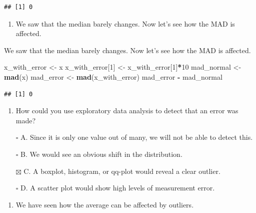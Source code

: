 \documentclass[
]{article}
\newenvironment{Shaded}{\begin{snugshade}}{\end{snugshade}}
\newcommand{\DecValTok}[1]{\textcolor[rgb]{0.00,0.00,0.81}{#1}}
\newcommand{\KeywordTok}[1]{\textcolor[rgb]{0.13,0.29,0.53}{\textbf{#1}}}
\newcommand{\NormalTok}[1]{#1}
\newcommand{\OperatorTok}[1]{\textcolor[rgb]{0.81,0.36,0.00}{\textbf{#1}}}
\newcommand{\StringTok}[1]{\textcolor[rgb]{0.31,0.60,0.02}{#1}}
\providecommand{\tightlist}{%
  \setlength{\itemsep}{0pt}\setlength{\parskip}{0pt}}
\begin{document}
\begin{verbatim}
## [1] 0
\end{verbatim}

\begin{enumerate}
\def\labelenumi{\arabic{enumi}.}
\setcounter{enumi}{5}
\tightlist
\item
  We saw that the median barely changes. Now let's see how the MAD is
  affected.
\end{enumerate}

We saw that the median barely changes. Now let's see how the MAD is
affected.

\begin{Shaded}
\begin{Highlighting}[]
\NormalTok{x_with_error <-}\StringTok{ }\NormalTok{x}
\NormalTok{x_with_error[}\DecValTok{1}\NormalTok{] <-}\StringTok{ }\NormalTok{x_with_error[}\DecValTok{1}\NormalTok{]}\OperatorTok{*}\DecValTok{10}
\NormalTok{mad_normal <-}\StringTok{ }\KeywordTok{mad}\NormalTok{(x)}
\NormalTok{mad_error <-}\StringTok{ }\KeywordTok{mad}\NormalTok{(x_with_error)}
\NormalTok{mad_error }\OperatorTok{-}\StringTok{ }\NormalTok{mad_normal}
\end{Highlighting}
\end{Shaded}

\begin{verbatim}
## [1] 0
\end{verbatim}

\begin{enumerate}
\def\labelenumi{\arabic{enumi}.}
\setcounter{enumi}{6}
\tightlist
\item
  How could you use exploratory data analysis to detect that an error
  was made?
\end{enumerate}

\begin{itemize}
\tightlist
\item[$\square$]
  A. Since it is only one value out of many, we will not be able to
  detect this.
\item[$\square$]
  B. We would see an obvious shift in the distribution.
\item[$\boxtimes$]
  C. A boxplot, histogram, or qq-plot would reveal a clear outlier.
\item[$\square$]
  D. A scatter plot would show high levels of measurement error.
\end{itemize}

\begin{enumerate}
\def\labelenumi{\arabic{enumi}.}
\setcounter{enumi}{7}
\tightlist
\item
  We have seen how the average can be affected by outliers.
\end{enumerate}
\end{document}
